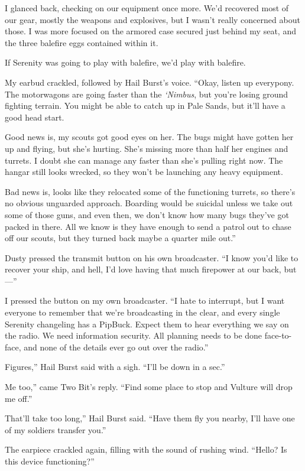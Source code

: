 I glanced back, checking on our equipment once more. We’d recovered most of our gear, mostly the weapons and explosives, but I wasn’t really concerned about those. I was more focused on the armored case secured just behind my seat, and the three balefire eggs contained within it.

If Serenity was going to play with balefire, we’d play with balefire.

My earbud crackled, followed by Hail Burst’s voice. “Okay, listen up everypony. The motorwagons are going faster than the \textit{‘Nimbus}, but you’re losing ground fighting terrain. You might be able to catch up in Pale Sands, but it’ll have a good head start.

\leavevmode{}Good news is, my scouts got good eyes on her. The bugs might have gotten her up and flying, but she’s hurting. She’s missing more than half her engines and turrets. I doubt she can manage any faster than she’s pulling right now. The hangar still looks wrecked, so they won’t be launching any heavy equipment.

\leavevmode{}Bad news is, looks like they relocated some of the functioning turrets, so there’s no obvious unguarded approach. Boarding would be suicidal unless we take out some of those guns, and even then, we don’t know how many bugs they’ve got packed in there. All we know is they have enough to send a patrol out to chase off our scouts, but they turned back maybe a quarter mile out.”

Dusty pressed the transmit button on his own broadcaster. “I know you’d like to recover your ship, and hell, I’d love having that much firepower at our back, but—”

I pressed the button on my own broadcaster. “I hate to interrupt, but I want everyone to remember that we’re broadcasting in the clear, and every single Serenity changeling has a PipBuck. Expect them to hear everything we say on the radio. We need information security. All planning needs to be done face-to-face, and none of the details ever go out over the radio.”

\leavevmode{}Figures,” Hail Burst said with a sigh. “I’ll be down in a sec.”

\leavevmode{}Me too,” came Two Bit’s reply. “Find some place to stop and Vulture will drop me off.”

\leavevmode{}That’ll take too long,” Hail Burst said. “Have them fly you nearby, I’ll have one of my soldiers transfer you.”

The earpiece crackled again, filling with the sound of rushing wind. “Hello? Is this device functioning?”

